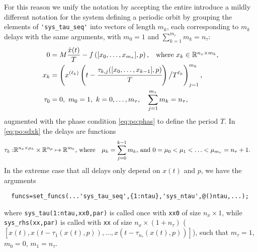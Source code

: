 \documentclass[11pt]{scrartcl}
\newcommand{\R}{\mathbb{R}}
\newcommand{\blist}[1]{\mbox{\lstinline!#1!}}
\begin{document}
For this reason we unify the notation by accepting the entire introduce a mildly different notation for the
system defining a periodic orbit by grouping the elements of
\blist{'sys_tau_seq'} into vectors of length $m_k$, each corresponding
to $m_k$ delays with the same arguments, with $m_0=1$ and
$\sum_{k=1}^{m_\tau}m_k=n_\tau$:
\begin{align}
  \label{eq:po:sddde}
  0&=M\frac{\dot x(t)}{T}-f\left([x_0,\ldots,x_{m_\tau}],p\right)\mbox{,\quad where $x_k\in\R^{n_x\times m_k}$,}\\
    \label{eq:po:sdxk}
  x_k&=\left(x^{(\ell_k)}\left(t-\cfrac{\tau_{k,j}([x_0,\ldots,x_{k-1}],p)}{T}\right)\big/T^{\ell_k}\right)_{j=1}^{m_k}\mbox{,}\\
  \nonumber
  \tau_0&=0,\ m_0=1,\  k=0,\ldots,m_\tau,\quad \sum_{j=1}^{m_\tau}m_k=n_\tau,
\end{align}
augmented with the phase condition \eqref{eq:po:phas} to define the
period $T$. In \eqref{eq:po:sdxk} the delays are functions
\begin{align*}
\tau_k:&\R^{n_x\times \mu_k}\times\R^{n_p}\mapsto\R^{m_k}\mbox{,\ where\quad}
\mu_k=\sum_{j=0}^{k-1}m_k\mbox{,\ and\ }0=\mu_0<\mu_1<\ldots<\mu_{m_\tau}=n_\tau+1.
\end{align*}
In the extreme case that all delays only depend on $x(t)$ and $p$, we
have the arguments
\begin{lstlisting}
  funcs=set_funcs(...'sys_tau_seq',{1:ntau},'sys_ntau',@()ntau,...);
\end{lstlisting}
where \blist{sys_tau(1:ntau,xx0,par)} is called once with \blist{xx0} of size
$n_x\times1$, while \blist{sys_rhs(xx,par)} is called with \blist{xx}
of size $n_x\times(1+n_\tau)$
($[x(t),x(t-\tau_1(x(t),p)),\ldots,x(t-\tau_{n_\tau}(x(t),p))]$), such
that $m_\tau=1$, $m_0=0$, $m_1=n_\tau$.
\end{document}
